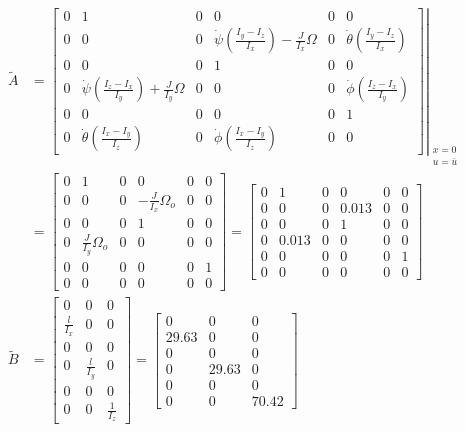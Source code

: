 \documentclass[12pt]{article}
\begin{document}
\begin{equation}
  \begin{split}
    \tilde{A} &= {\left. \begin{bmatrix} 0 & 1 & 0 & 0 & 0 & 0 \\ 0 & 0 & 0 & \dot{\psi} \left (\frac{I_y - I_z}{I_x} \right ) - \frac{J}{I_x} \Omega & 0 & \dot{\theta} \left (\frac{I_y - I_z}{I_x} \right ) \\ 0 & 0 & 0 & 1 & 0 & 0 \\ 0 & \dot{\psi} \left (\frac{I_z - I_x}{I_y} \right ) + \frac{J}{I_y} \Omega & 0 & 0 & 0 & \dot{\phi} \left (\frac{I_z - I_x}{I_y} \right ) \\ 0 & 0 & 0 & 0 & 0 & 1 \\ 0 & \dot{\theta} \left (\frac{I_x - I_y}{I_z} \right ) & 0 & \dot{\phi} \left (\frac{I_x - I_y}{I_z} \right ) & 0 & 0 \end{bmatrix} \right |}_{\begin{smallmatrix} x = 0 \\ u = \bar{u} \end{smallmatrix}} \\
    &= \begin{bmatrix} 0 & 1 & 0 & 0 & 0 & 0 \\ 0 & 0 & 0 & -\frac{J}{I_x} \Omega_o & 0 & 0 \\ 0 & 0 & 0 & 1 & 0 & 0 \\ 0 & \frac{J}{I_y} \Omega_o & 0 & 0 & 0 & 0 \\ 0 & 0 & 0 & 0 & 0 & 1 \\ 0 & 0 & 0 & 0 & 0 & 0 \end{bmatrix} = \begin{bmatrix} 0 & 1 & 0 & 0 & 0 & 0 \\ 0 & 0 & 0 & 0.013 & 0 & 0 \\ 0 & 0 & 0 & 1 & 0 & 0 \\ 0 & 0.013 & 0 & 0 & 0 & 0 \\ 0 & 0 & 0 & 0 & 0 & 1 \\ 0 & 0 & 0 & 0 & 0 & 0 \end{bmatrix} \\
    \tilde{B} &= \begin{bmatrix} 0 & 0 & 0 \\ \frac{l}{I_x} & 0 & 0 \\ 0 & 0 & 0 \\ 0 & \frac{l}{I_y} & 0 \\ 0 & 0 & 0 \\ 0 & 0 & \frac{1}{I_z} \end{bmatrix} = \begin{bmatrix} 0 & 0 & 0 \\ 29.63 & 0 & 0 \\ 0 & 0 & 0 \\ 0 & 29.63 & 0 \\ 0 & 0 & 0 \\ 0 & 0 & 70.42 \end{bmatrix}
  \end{split}
\end{equation}
\end{document}

